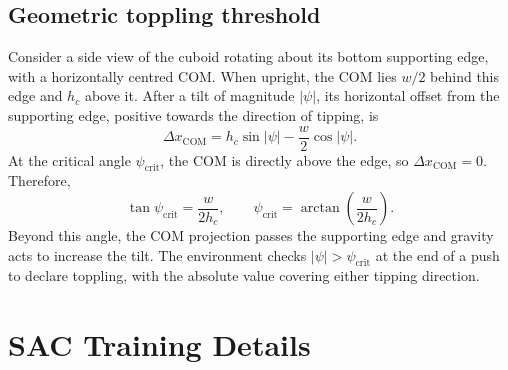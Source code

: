 \documentclass[12pt]{article}
\begin{document}
\subsection{Geometric toppling threshold}\label{app:toppling-threshold}
Consider a side view of the cuboid rotating about its bottom supporting edge, with a horizontally centred COM. When upright, the COM lies $w/2$ behind this edge and $h_c$ above it. After a tilt of magnitude $|\psi|$, its horizontal offset from the supporting edge, positive towards the direction of tipping, is
\begin{equation}
\Delta x_{\mathrm{COM}}=h_c\sin|\psi|-\frac{w}{2}\cos|\psi|.
\end{equation}
At the critical angle $\psi_{\mathrm{crit}}$, the COM is directly above the edge, so $\Delta x_{\mathrm{COM}}=0$. Therefore,
\begin{equation}
\tan\psi_{\mathrm{crit}}=\frac{w}{2h_c},
\qquad
\psi_{\mathrm{crit}}=\arctan\!\left(\frac{w}{2h_c}\right).
\end{equation}
Beyond this angle, the COM projection passes the supporting edge and gravity acts to increase the tilt. The environment checks $|\psi|>\psi_{\mathrm{crit}}$ at the end of a push to declare toppling, with the absolute value covering either tipping direction.

\section{SAC Training Details}\label{app:actor-details}
\end{document}
